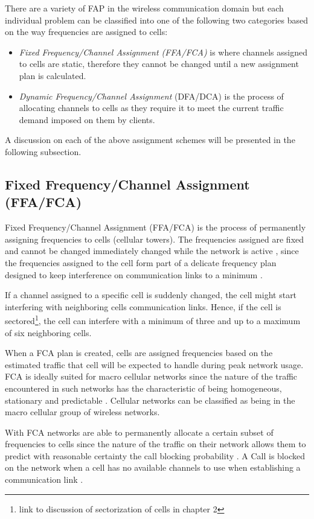 There are a variety of FAP in the wireless communication domain but each individual problem can be classified into one of the following two categories based on the way frequencies are assigned to cells:
\begin{itemize}
\item \emph{Fixed Frequency/Channel Assignment (FFA/FCA)} is where channels assigned to cells are static, therefore they cannot be changed until a new assignment plan is calculated.
\item \emph{Dynamic Frequency/Channel Assignment} (DFA/DCA) is the process of allocating channels to cells as they require it to meet the current traffic demand imposed on them by clients. 
\end{itemize}

A discussion on each of the above assignment schemes will be presented in the following subsection.
\subsection{Fixed Frequency/Channel Assignment (FFA/FCA)}
Fixed Frequency/Channel Assignment (FFA/FCA) is the process of permanently assigning frequencies to cells (cellular towers). The frequencies assigned are fixed and cannot be changed immediately changed while the network is active , since the frequencies assigned to the cell form part of a delicate frequency plan designed to keep interference on communication links to a minimum \cite{PrinciplesMobileCommunication}. 

If a channel assigned to a specific cell is suddenly changed, the cell might start interfering with neighboring cells communication links. Hence, if the cell is sectored\footnote{link to discussion of sectorization of cells in chapter 2}, the cell can interfere with a minimum of three and up to a maximum of six neighboring cells\cite{PrinciplesMobileCommunication}.

When a FCA plan is created, cells are assigned frequencies based on the estimated traffic that cell will be expected to handle during peak network usage. FCA is ideally suited for macro cellular networks since the nature of the traffic encountered in such networks has the characteristic of being homogeneous, stationary and predictable \cite{PrinciplesMobileCommunication}. Cellular networks can be classified as being in the macro cellular group of wireless networks.

With FCA networks are able to permanently allocate a certain subset of frequencies to cells since the nature of the traffic on their network allows them to predict with reasonable certainty the call blocking probability \cite{PrinciplesMobileCommunication}. A Call is blocked on the network when a cell has no available channels to use when establishing a communication link \cite{PrinciplesMobileCommunication}.

